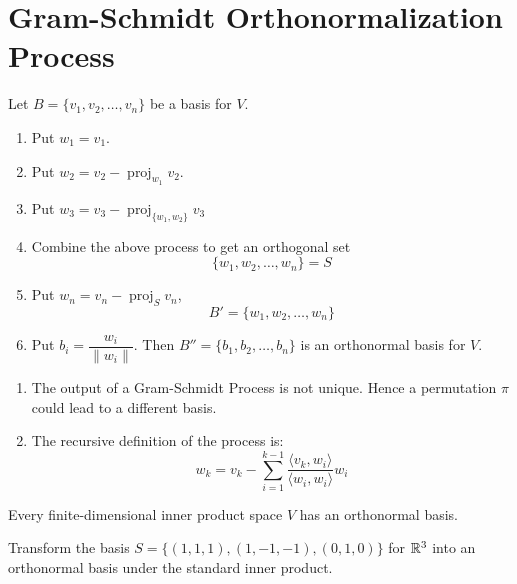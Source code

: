 \newpage
\section{Gram-Schmidt Orthonormalization Process}
\begin{definition}
Let $B = \{v_1, v_2, \dots, v_n\}$ be a basis for $V$.
\begin{enumerate}
    \item Put $w_1 = v_1$.
    \item Put $w_2 = v_2 - \operatorname{proj}_{w_1}v_2$.
    \item Put $w_3 = v_3 - \operatorname{proj}_{\{w_1, w_2\}}v_3$
    \item Combine the above process to get an orthogonal set $$\{w_1, w_2, \dots, w_n\} = S$$
    \item Put $w_n = v_n - \operatorname{proj}_Sv_n$,
    $$B' = \{w_1, w_2, \dots, w_n\}$$
    \item Put $b_i = \dfrac{w_i}{\lVert w_i \rVert}$. Then $B'' = \{b_1, b_2, \dots, b_n\}$ is an orthonormal basis for $V$.
\end{enumerate}
\end{definition}

\begin{remark}
\leavevmode
\begin{enumerate}
    \item The output of a Gram-Schmidt Process is not unique. Hence a permutation $\pi$ could lead to a different basis.
    \item The recursive definition of the process is:
    $$w_k = v_k - \sum_{i = 1}^{k-1}\frac{\langle v_k, w_i\rangle}{\langle w_i, w_i \rangle}w_i$$
\end{enumerate}
\end{remark}

\begin{theorem}
Every finite-dimensional inner product space $V$ has an orthonormal basis.
\end{theorem}

\begin{example}
Transform the basis $S = \{(1, 1, 1), (1, -1, -1), (0, 1, 0)\}$ for $\mathbb{R}^3$ into an orthonormal basis under the standard inner product.
\end{example}

